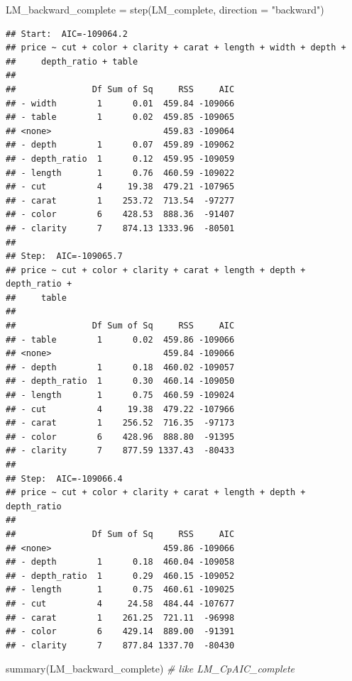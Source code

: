 \documentclass[
]{article}
\newenvironment{Shaded}{\begin{snugshade}}{\end{snugshade}}
\newcommand{\AttributeTok}[1]{\textcolor[rgb]{0.77,0.63,0.00}{#1}}
\newcommand{\CommentTok}[1]{\textcolor[rgb]{0.56,0.35,0.01}{\textit{#1}}}
\newcommand{\FunctionTok}[1]{\textcolor[rgb]{0.00,0.00,0.00}{#1}}
\newcommand{\NormalTok}[1]{#1}
\newcommand{\OtherTok}[1]{\textcolor[rgb]{0.56,0.35,0.01}{#1}}
\newcommand{\StringTok}[1]{\textcolor[rgb]{0.31,0.60,0.02}{#1}}
\begin{document}
\begin{Shaded}
\begin{Highlighting}[]
\NormalTok{LM\_backward\_complete }\OtherTok{=} \FunctionTok{step}\NormalTok{(LM\_complete, }\AttributeTok{direction =} \StringTok{"backward"}\NormalTok{)}
\end{Highlighting}
\end{Shaded}

\begin{verbatim}
## Start:  AIC=-109064.2
## price ~ cut + color + clarity + carat + length + width + depth + 
##     depth_ratio + table
## 
##               Df Sum of Sq     RSS     AIC
## - width        1      0.01  459.84 -109066
## - table        1      0.02  459.85 -109065
## <none>                      459.83 -109064
## - depth        1      0.07  459.89 -109062
## - depth_ratio  1      0.12  459.95 -109059
## - length       1      0.76  460.59 -109022
## - cut          4     19.38  479.21 -107965
## - carat        1    253.72  713.54  -97277
## - color        6    428.53  888.36  -91407
## - clarity      7    874.13 1333.96  -80501
## 
## Step:  AIC=-109065.7
## price ~ cut + color + clarity + carat + length + depth + depth_ratio + 
##     table
## 
##               Df Sum of Sq     RSS     AIC
## - table        1      0.02  459.86 -109066
## <none>                      459.84 -109066
## - depth        1      0.18  460.02 -109057
## - depth_ratio  1      0.30  460.14 -109050
## - length       1      0.75  460.59 -109024
## - cut          4     19.38  479.22 -107966
## - carat        1    256.52  716.35  -97173
## - color        6    428.96  888.80  -91395
## - clarity      7    877.59 1337.43  -80433
## 
## Step:  AIC=-109066.4
## price ~ cut + color + clarity + carat + length + depth + depth_ratio
## 
##               Df Sum of Sq     RSS     AIC
## <none>                      459.86 -109066
## - depth        1      0.18  460.04 -109058
## - depth_ratio  1      0.29  460.15 -109052
## - length       1      0.75  460.61 -109025
## - cut          4     24.58  484.44 -107677
## - carat        1    261.25  721.11  -96998
## - color        6    429.14  889.00  -91391
## - clarity      7    877.84 1337.70  -80430
\end{verbatim}

\begin{Shaded}
\begin{Highlighting}[]
\FunctionTok{summary}\NormalTok{(LM\_backward\_complete)   }\CommentTok{\# like LM\_CpAIC\_complete}
\end{Highlighting}
\end{Shaded}
\end{document}
